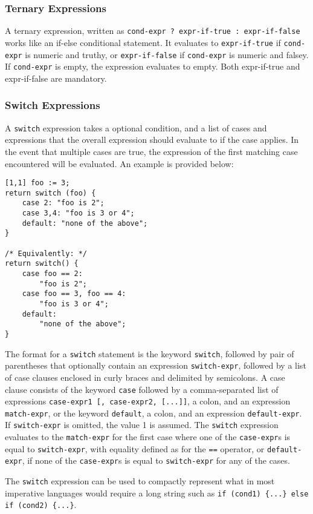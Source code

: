 \subsubsection{Ternary Expressions}
\label{sec:Ternary}
A ternary expression, written as \texttt{cond-expr ? expr-if-true : expr-if-false} works like an if-else conditional statement. It evaluates to \texttt{expr-if-true} if \texttt{cond-expr} is numeric and truthy, or  \texttt{expr-if-false} if \texttt{cond-expr} is numeric and falsey. If \texttt{cond-expr} is empty, the expression evaluates to empty. Both expr-if-true and expr-if-false are mandatory.

\subsubsection{Switch Expressions}
\label{sec:Switch}			
A \texttt{switch} expression takes a optional condition, and a list of cases and expressions that the overall expression should evaluate to if the case applies. In the event that multiple cases are true, the expression of the first matching case encountered will be evaluated. An example is provided below:
\begin{lstlisting}
[1,1] foo := 3;
return switch (foo) {
	case 2: "foo is 2";
	case 3,4: "foo is 3 or 4";
	default: "none of the above";
}

/* Equivalently: */
return switch() {
	case foo == 2:
		"foo is 2";
	case foo == 3, foo == 4:
		"foo is 3 or 4";
	default:
		"none of the above";
}
\end{lstlisting}
The format for a \texttt{switch} statement is the keyword \texttt{switch}, followed by pair of parentheses that optionally contain an expression \texttt{switch-expr}, followed by a list of case clauses enclosed in curly braces and delimited by semicolons. A case clause consists of the keyword \texttt{case} followed by a comma-separated list of expressions \texttt{case-expr1 [, case-expr2, [...]]}, a colon, and an expression \texttt{match-expr}, or the keyword \texttt{default}, a colon, and an expression \texttt{default-expr}. If \texttt{switch-expr} is omitted, the value 1 is assumed. The \texttt{switch} expression evaluates to the \texttt{match-expr} for the first case where one of the \texttt{case-expr}s is equal to \texttt{switch-expr}, with equality defined as for the \texttt{==} operator, or \texttt{default-expr}, if none of the \texttt{case-expr}s is equal to \texttt{switch-expr} for any of the cases. 

The \texttt{switch} expression can be used to compactly represent what in most imperative languages would require a long string such as \texttt{if (cond1) \{...\} else if (cond2) \{...\}}.
